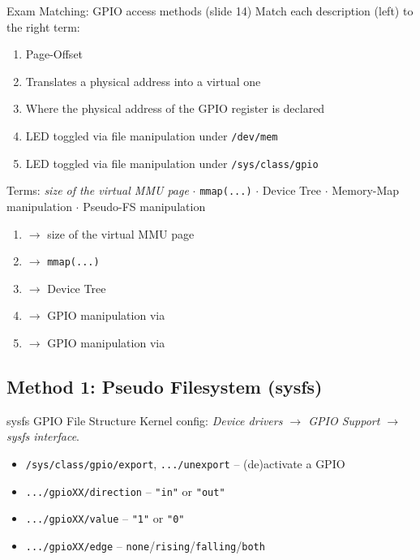 \begin{example2}{Exam Matching: GPIO access methods (slide 14)}
    Match each description (left) to the right term:
    \begin{enumerate}
        \item Page-Offset
        \item Translates a physical address into a virtual one
        \item Where the physical address of the GPIO register is declared
        \item LED toggled via file manipulation under \texttt{/dev/mem}
        \item LED toggled via file manipulation under \texttt{/sys/class/gpio}
    \end{enumerate}
    Terms: \emph{size of the virtual MMU page} $\cdot$ \texttt{mmap(...)} $\cdot$
    Device Tree $\cdot$ Memory-Map manipulation $\cdot$ Pseudo-FS manipulation
    \tcblower
    \begin{enumerate}
        \item $\to$ size of the virtual MMU page
        \item $\to$ \texttt{mmap(...)}
        \item $\to$ Device Tree
        \item $\to$ GPIO manipulation via 
        \item $\to$ GPIO manipulation via 
    \end{enumerate}
\end{example2}

\raggedcolumns
\columnbreak

\subsection{Method 1: Pseudo Filesystem (sysfs)}

\begin{definition}{sysfs GPIO File Structure}
    Kernel config: \emph{Device drivers $\to$ GPIO Support $\to$ sysfs interface}.
    \begin{itemize}
        \item \texttt{/sys/class/gpio/export}, \texttt{.../unexport} -- (de)activate a GPIO
        \item \texttt{.../gpioXX/direction} -- \texttt{"in"} or \texttt{"out"}
        \item \texttt{.../gpioXX/value} -- \texttt{"1"} or \texttt{"0"}
        \item \texttt{.../gpioXX/edge} -- \texttt{none}/\texttt{rising}/\texttt{falling}/\texttt{both}
    \end{itemize}
\end{definition}

